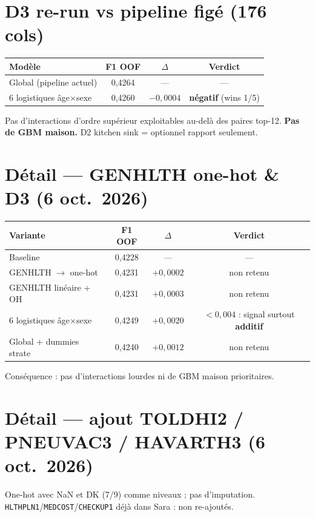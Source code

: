 \documentclass[11pt,a4paper]{article}
\begin{document}
\section{D3 re-run vs pipeline figé (176 cols)}
\begin{center}
\begin{tabular}{@{}lccc@{}}
\toprule
Modèle & F1 OOF & $\Delta$ & Verdict \\
\midrule
Global (pipeline actuel) & 0{,}4264 & --- & --- \\
6 logistiques âge$\times$sexe & 0{,}4260 & $-0{,}0004$ & \textbf{négatif} (wins 1/5) \\
\bottomrule
\end{tabular}
\end{center}
\noindent Pas d'interactions d'ordre supérieur exploitables au-delà des paires top-12.
\textbf{Pas de GBM maison.} D2 kitchen sink = optionnel rapport seulement.

\section{Détail --- GENHLTH one-hot \& D3 (6 oct.\ 2026)}
\begin{center}
\begin{tabular}{@{}lccc@{}}
\toprule
Variante & F1 OOF & $\Delta$ & Verdict \\
\midrule
Baseline & 0{,}4228 & --- & --- \\
GENHLTH $\to$ one-hot & 0{,}4231 & $+0{,}0002$ & non retenu \\
GENHLTH linéaire + OH & 0{,}4231 & $+0{,}0003$ & non retenu \\
6 logistiques âge$\times$sexe & 0{,}4249 & $+0{,}0020$ & $<0{,}004$ : signal surtout \textbf{additif} \\
Global + dummies strate & 0{,}4240 & $+0{,}0012$ & non retenu \\
\bottomrule
\end{tabular}
\end{center}
\noindent Conséquence : pas d'interactions lourdes ni de GBM maison prioritaires.

\section{Détail --- ajout TOLDHI2 / PNEUVAC3 / HAVARTH3 (6 oct.\ 2026)}
One-hot avec NaN et DK (7/9) comme niveaux ; pas d'imputation.
\texttt{HLTHPLN1}/\texttt{MEDCOST}/\texttt{CHECKUP1} déjà dans Sara : non re-ajoutés.
\end{document}
